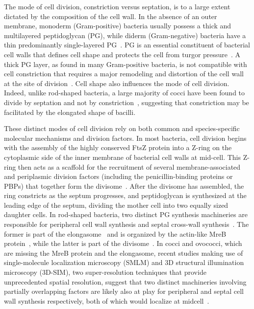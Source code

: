 The mode of cell division, constriction versus septation, is to a large extent dictated by the composition of the cell wall.
In the absence of an outer membrane, monoderm (Gram-positive) bacteria usually possess a thick and multilayered peptidoglycan (PG), while diderm (Gram-negative) bacteria have a thin predominantly single-layered PG~\cite{gardePeptidoglycanStructureSynthesis2021}.
PG is an essential constituent of bacterial cell walls that defines cell shape and protects the cell from turgor pressure~\cite{gardePeptidoglycanStructureSynthesis2021}.
A thick PG layer, as found in many Gram-positive bacteria, is not compatible with cell constriction that requires a major remodeling and distortion of the cell wall at the site of division~\cite{nguyenSimulationsSuggestConstrictive2019}.
Cell shape also influences the mode of cell division.
Indeed, unlike rod-shaped bacteria, a large majority of cocci have been found to divide by septation and not by constriction~\cite{zapunDifferentShapesCocci2008,pinhoHowGetMechanisms2013}, suggesting that constriction may be facilitated by the elongated shape of bacilli.

These distinct modes of cell division rely on both common and species-specific molecular mechanisms and division factors.
In most bacteria, cell division begins with the assembly of the highly conserved FtsZ protein into a Z-ring on the cytoplasmic side of the inner membrane of bacterial cell walls at mid-cell.
This Z-ring then acts as a scaffold for the recruitment of several membrane-associated and periplasmic division factors (including the penicillin-binding proteins or PBPs) that together form the divisome~\cite{pinhoHowGetMechanisms2013}.
After the divisome has assembled, the ring constricts as the septum progresses, and peptidoglycan is synthesized at the leading edge of the septum, dividing the mother cell into two equally sized daughter cells.
In rod-shaped bacteria, two distinct PG synthesis machineries are responsible for peripheral cell wall synthesis and septal cross-wall synthesis~\cite{eganRegulationPeptidoglycanSynthesis2020}.
The former is part of the elongasome~\cite{eganRegulationPeptidoglycanSynthesis2020} and is organized by the actin-like MreB protein~\cite{eganRegulationBacterialCell2017}, while the latter is part of the divisome~\cite{duAssemblyActivationEscherichia2017,denblaauwenDivisome25Road2017}.
In cocci and ovococci, which are missing the MreB protein and the elongasome, recent studies making use of single-molecule localization microscopy (SMLM) and 3D structural illumination microscopy (3D-SIM), two super-resolution techniques that provide unprecedented spatial resolution, suggest that two distinct machineries involving partially overlapping factors are likely also at play for peripheral and septal cell wall synthesis respectively, both of which would localize at midcell~\cite{pinhoHowGetMechanisms2013,trouveNanoscaleDynamicsPeptidoglycan2021,perezOrganizationPeptidoglycanSynthesis2021,perez-nunezNewMorphogenesisPathway2011,lundMolecularCoordinationStaphylococcus2018}.

